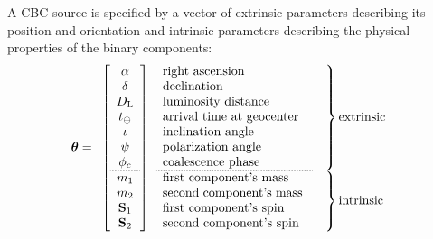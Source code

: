 \documentclass{iopart}
\begin{document}
A \ac{CBC} source is specified by a vector of extrinsic parameters describing its position and orientation and intrinsic parameters describing the physical properties of the binary components:
%
\begin{equation}
    \boldsymbol\theta = \begin{array}{l@{}l}
            \left[
            \begin{array}{c}
                \alpha \\
                \delta \\
                D_\mathrm{L} \\
                t_\oplus \\
                \iota \\
                \psi \\
                \phi_c \\
                \hdashline[1pt/1pt]
                m_1 \\
                m_2 \\
                \mathbf S_1 \\
                \mathbf S_2
            \end{array}
            \right] &
            \begin{array}{l}
                \left.
                \begin{array}{p{4cm}}
                    right ascension \\
                    declination \\
                    luminosity distance \\
                    arrival time at geocenter \\
                    inclination angle \\
                    polarization angle \\
                    coalescence phase \\
                    \hdashline[1pt/1pt]
                \end{array}
                \quad \right\} \textnormal{extrinsic} \\
                \left.
                \begin{array}{p{4cm}}
                    first component's mass \\
                    second component's mass \\
                    first component's spin \\
                    second component's spin
                \end{array}
                \quad \right\} \textnormal{intrinsic}
            \end{array}
        \end{array}
\end{equation}
\end{document}

